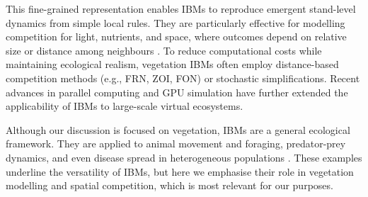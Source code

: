 This fine-grained representation enables IBMs to reproduce emergent stand-level dynamics from simple local rules. They are particularly effective for modelling competition for light, nutrients, and space, where outcomes depend on relative size or distance among neighbours \cite{McLane2011,Zhang2020}. To reduce computational costs while maintaining ecological realism, vegetation IBMs often employ distance-based competition methods (e.g., FRN, ZOI, FON) or stochastic simplifications. Recent advances in parallel computing and GPU simulation have further extended the applicability of IBMs to large-scale virtual ecosystems.

Although our discussion is focused on vegetation, IBMs are a general ecological framework. They are applied to animal movement and foraging, predator-prey dynamics, and even disease spread in heterogeneous populations \cite{Grimm2005,Chng2013,Perez2009}. These examples underline the versatility of IBMs, but here we emphasise their role in vegetation modelling and spatial competition, which is most relevant for our purposes.




